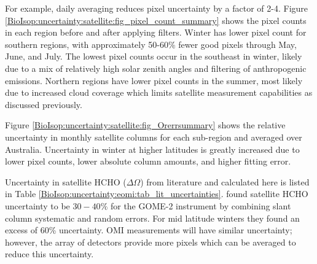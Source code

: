     For example, daily averaging reduces pixel uncertainty by a factor of 2-4.
    Figure \ref{BioIsop:uncertainty:satellite:fig_pixel_count_summary} shows the pixel counts in each region before and after applying filters.
    Winter has lower pixel count for southern regions, with approximately 50-60\% fewer good pixels through May, June, and July.
    The lowest pixel counts occur in the southeast in winter, likely due to a mix of relatively high solar zenith angles and filtering of anthropogenic emissions.
    Northern regions have lower pixel counts in the summer, most likely due to increased cloud coverage which limits satellite measurement capabilities as discussed previously.
    
    
    
    
    Figure \ref{BioIsop:uncertainty:satellite:fig_Orerrsummary} shows the relative uncertainty in monthly satellite columns for each sub-region and averaged over Australia.
    Uncertainty in winter at higher latitudes is greatly increased due to lower pixel counts, lower absolute column amounts, and higher fitting error.
    
    
    
    
    Uncertainty in satellite HCHO ($\Delta{\Omega}$) from literature and calculated here is listed in Table \ref{BioIsop:uncertainty:eomi:tab_lit_uncertainties}.
    \textcite{DeSmedt2012} found satellite HCHO uncertainty to be $30-40\%$ for the GOME-2 instrument by combining slant column systematic and random errors.
    For mid latitude winters they found an excess of 60\% uncertainty.
    OMI measurements will have similar  uncertainty; however, the array of detectors provide more pixels which can be averaged to reduce this uncertainty.
    
